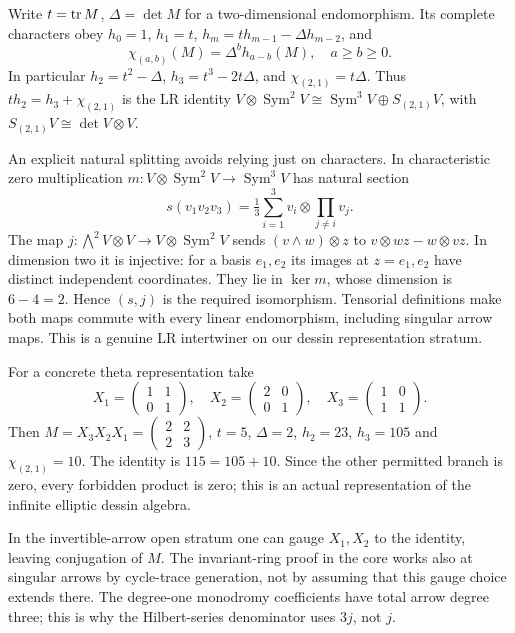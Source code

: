 Write $t=\operatorname{tr} M$, $\Delta=\det M$ for a two-dimensional endomorphism. Its complete characters obey $h_0=1$, $h_1=t$, $h_m=th_{m-1}-\Delta h_{m-2}$, and
\[
 \chi_{(a,b)}(M)=\Delta^b h_{a-b}(M),\quad a\ge b\ge0.
\]
In particular $h_2=t^2-\Delta$, $h_3=t^3-2t\Delta$, and $\chi_{(2,1)}=t\Delta$. Thus $t h_2=h_3+\chi_{(2,1)}$ is the LR identity $V\otimes\operatorname{Sym}^2V\cong\operatorname{Sym}^3V\oplus S_{(2,1)}V$, with $S_{(2,1)}V\cong\det V\otimes V$.

An explicit natural splitting avoids relying just on characters. In characteristic zero multiplication $m:V\otimes\operatorname{Sym}^2V\to\operatorname{Sym}^3V$ has natural section
\[
 s(v_1v_2v_3)=\tfrac13\sum_{i=1}^3v_i\otimes\prod_{j\ne i}v_j.
\]
The map $j:\bigwedge^2V\otimes V\to V\otimes\operatorname{Sym}^2V$ sends $(v\wedge w)\otimes z$ to $v\otimes wz-w\otimes vz$. In dimension two it is injective: for a basis $e_1,e_2$ its images at $z=e_1,e_2$ have distinct independent coordinates. They lie in $\ker m$, whose dimension is $6-4=2$. Hence $(s,j)$ is the required isomorphism. Tensorial definitions make both maps commute with every linear endomorphism, including singular arrow maps. This is a genuine LR intertwiner on our dessin representation stratum.

For a concrete theta representation take
\[
 X_1=\begin{pmatrix}1&1\\0&1\end{pmatrix},\quad
 X_2=\begin{pmatrix}2&0\\0&1\end{pmatrix},\quad
 X_3=\begin{pmatrix}1&0\\1&1\end{pmatrix}.
\]
Then $M=X_3X_2X_1=\left(\begin{smallmatrix}2&2\\2&3\end{smallmatrix}\right)$, $t=5$, $\Delta=2$, $h_2=23$, $h_3=105$ and $\chi_{(2,1)}=10$. The identity is $115=105+10$. Since the other permitted branch is zero, every forbidden product is zero; this is an actual representation of the infinite elliptic dessin algebra.

In the invertible-arrow open stratum one can gauge $X_1,X_2$ to the identity, leaving conjugation of $M$. The invariant-ring proof in the core works also at singular arrows by cycle-trace generation, not by assuming that this gauge choice extends there. The degree-one monodromy coefficients have total arrow degree three; this is why the Hilbert-series denominator uses $3j$, not $j$.

